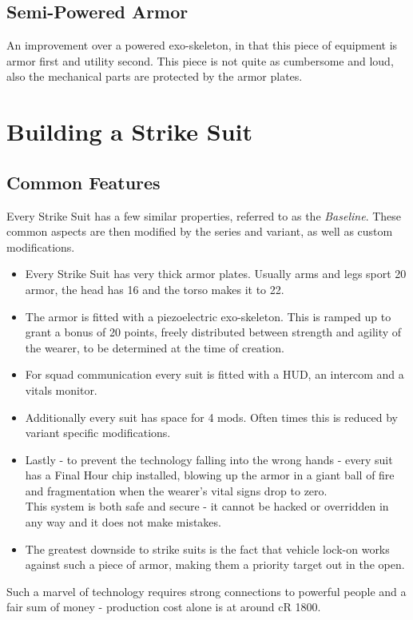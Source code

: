 \documentclass[12pt,a4paper,openany,usenames,dvipsnames]{book}
\begin{document}
	\section{Semi-Powered Armor}
	An improvement over a powered exo-skeleton, in that this piece of equipment is armor first and utility second. This piece is not quite as cumbersome and loud, also the mechanical parts are protected by the armor plates.
	\par
	
	\chapter{Building a Strike Suit}
	\section{Common Features}
	Every Strike Suit has a few similar properties, referred to as the \emph{Baseline}. These common aspects are then modified by the series and variant, as well as custom modifications.\par
	\begin{itemize}
		\setlength\itemsep{-5mm}
		\item Every Strike Suit has very thick armor plates. Usually arms and legs sport 20 armor, the head has 16 and the torso makes it to 22.
		\item The armor is fitted with a piezoelectric exo-skeleton. This is ramped up to grant a bonus of 20 points, freely distributed between strength and agility of the wearer, to be determined at the time of creation.
		\item For squad communication every suit is fitted with a HUD, an intercom and a vitals monitor.
		\item Additionally every suit has space for 4 mods. Often times this is reduced by variant specific modifications.
		\item Lastly - to prevent the technology falling into the wrong hands - every suit has a Final Hour chip installed, blowing up the armor in a giant ball of fire and fragmentation when the wearer's vital signs drop to zero.\\
		This system is both safe and secure - it cannot be hacked or overridden in any way and it does not make mistakes.
		\item The greatest downside to strike suits is the fact that vehicle lock-on works against such a piece of armor, making them a priority target out in the open.
	\end{itemize}
	\par
	Such a marvel of technology requires strong connections to powerful people and a fair sum of money - production cost alone is at around cR 1800.
\end{document}
